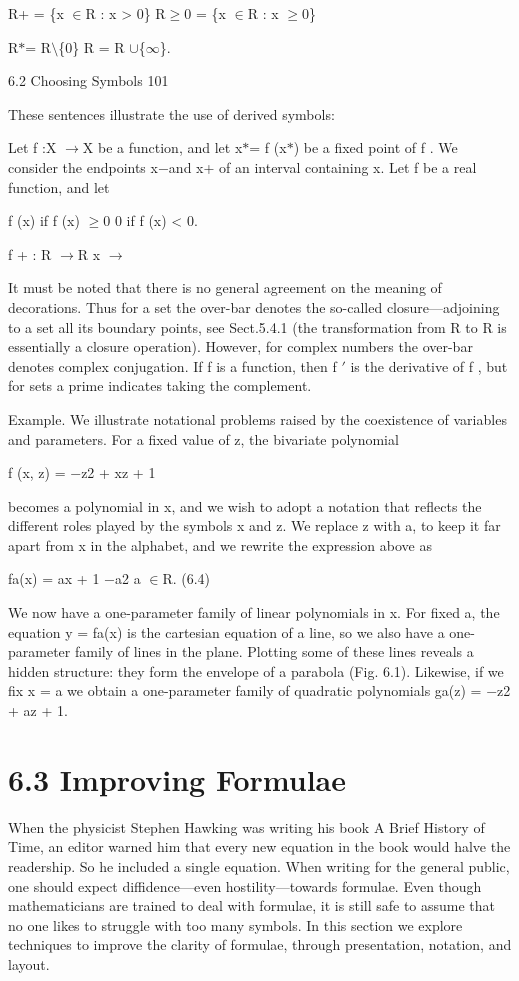 \documentclass[11pt]{article}
\theoremstyle{plain}
\theoremstyle{definition}
\begin{document}
R+ = \{x $\in$R : x > 0\} R$\geq$0 = \{x $\in$R : x $\geq$0\}

R$*$= R$\setminus$\{0\} R = R $\cup$\{$\infty$\}.

6.2 Choosing Symbols 101

These sentences illustrate the use of derived symbols:

Let f :X $\to$X be a function, and let x$*$= f (x$*$) be a fixed point of f . We consider the endpoints x$-$and x+ of an interval containing x. Let f be a real function, and let

f (x) if f (x) $\geq$0 0 if f (x) < 0.

f + : R $\to$R x $\to$

It must be noted that there is no general agreement on the meaning of decorations. Thus for a set the over-bar denotes the so-called closure---adjoining to a set all its boundary points, see Sect.5.4.1 (the transformation from R to R is essentially a closure operation). However, for complex numbers the over-bar denotes complex conjugation. If f is a function, then f $'$ is the derivative of f , but for sets a prime indicates taking the complement.

Example. We illustrate notational problems raised by the coexistence of variables and parameters. For a fixed value of z, the bivariate polynomial

f (x, z) = $-$z2 + xz + 1

becomes a polynomial in x, and we wish to adopt a notation that reflects the different roles played by the symbols x and z. We replace z with a, to keep it far apart from x in the alphabet, and we rewrite the expression above as

fa(x) = ax + 1 $-$a2 a $\in$R. (6.4)

We now have a one-parameter family of linear polynomials in x. For fixed a, the equation y = fa(x) is the cartesian equation of a line, so we also have a one-parameter family of lines in the plane. Plotting some of these lines reveals a hidden structure: they form the envelope of a parabola (Fig. 6.1). Likewise, if we fix x = a we obtain a one-parameter family of quadratic polynomials ga(z) = $-$z2 + az + 1.

\section{6.3 Improving Formulae}

When the physicist Stephen Hawking was writing his book A Brief History of Time, an editor warned him that every new equation in the book would halve the readership. So he included a single equation. When writing for the general public, one should expect diffidence---even hostility---towards formulae. Even though mathematicians are trained to deal with formulae, it is still safe to assume that no one likes to struggle with too many symbols. In this section we explore techniques to improve the clarity of formulae, through presentation, notation, and layout.
\end{document}

